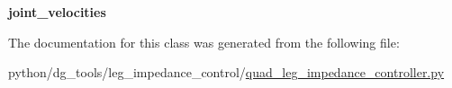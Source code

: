\begin{DoxyCompactItemize}
\item 
{\bfseries joint\+\_\+velocities}\hypertarget{classpython_1_1dg__tools_1_1leg__impedance__control_1_1quad__leg__impedance__controller_1_1QuadrupedLegImpedanceController_a6ffc1716a029c75c48c144650a4795fa}{}\label{classpython_1_1dg__tools_1_1leg__impedance__control_1_1quad__leg__impedance__controller_1_1QuadrupedLegImpedanceController_a6ffc1716a029c75c48c144650a4795fa}

\end{DoxyCompactItemize}


The documentation for this class was generated from the following file\+:\begin{DoxyCompactItemize}
\item 
python/dg\+\_\+tools/leg\+\_\+impedance\+\_\+control/\hyperlink{quad__leg__impedance__controller_8py}{quad\+\_\+leg\+\_\+impedance\+\_\+controller.\+py}\end{DoxyCompactItemize}
